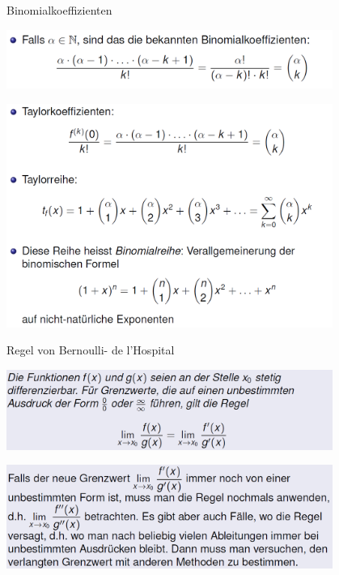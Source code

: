 \begin{lemma}{Binomialkoeffizienten}\\
  \begin{centering}
  \includegraphics[width=0.8\textwidth]{images/2024-06-02-19-31-35.png}\\
  \end{centering}
  \begin{centering}
  \includegraphics[width=0.8\textwidth]{images/2024-06-02-19-32-15.png}\\
  \end{centering}
\end{lemma}
\begin{definition}{Regel von Bernoulli- de l’Hospital}\\
  \begin{centering}
  \includegraphics[width=0.8\textwidth]{images/2024-06-02-21-42-08.png}\\
  \end{centering}
  \begin{centering}
  \includegraphics[width=0.8\textwidth]{images/2024-06-02-21-42-41.png}\\
  \end{centering}
\end{definition}
